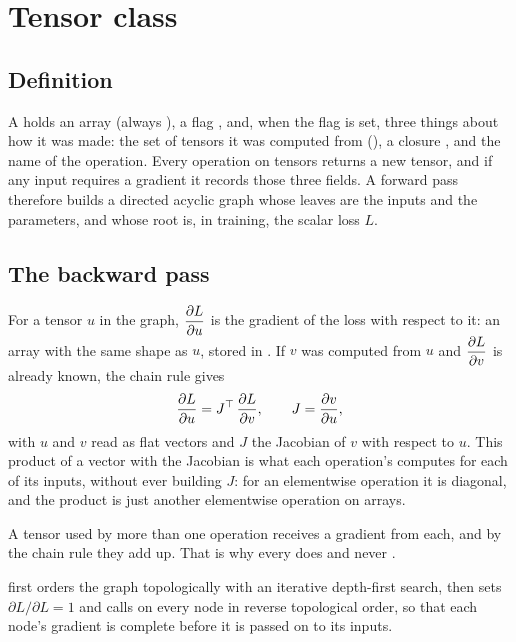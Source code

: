 \section{Tensor class}
\label{sec:autodiff}

\subsection{Definition}
A  holds an array  (always ), a flag ,
and, when the flag is set, three things about how it was made: the set of tensors it was computed
from (), a closure , and the name of the operation. Every operation
on tensors returns a new tensor, and if any input requires a gradient it records those three
fields. A forward pass therefore builds a directed acyclic graph whose leaves are the inputs and
the parameters, and whose root is, in training, the scalar loss $L$.

\subsection{The backward pass}
For a tensor $u$ in the graph, $\dfrac{\partial L}{\partial u}$ is the gradient of the loss with respect to it: an array
with the same shape as $u$, stored in . If $v$ was computed from $u$ and $\dfrac{\partial L}{\partial v}$ is
already known, the chain rule gives
\begin{equation}
  \frac{\partial L}{\partial u} = J^{\top}\, \frac{\partial L}{\partial v},
  \qquad J = \frac{\partial v}{\partial u},
  \label{eq:chain}
\end{equation}
with $u$ and $v$ read as flat vectors and $J$ the Jacobian of $v$ with respect to $u$. This product
of a vector with the Jacobian is what each operation's  computes for each of its
inputs, without ever building $J$: for an elementwise operation it is diagonal, and the product is
just another elementwise operation on arrays.

A tensor used by more than one operation receives a gradient from each, and by the chain rule they
add up. That is why every  does  and never .

 first orders the graph topologically with an iterative depth-first
search, then sets $\partial L/\partial L = 1$ and calls  on every node in reverse
topological order, so that each node's gradient is complete before it is passed on to its inputs.

